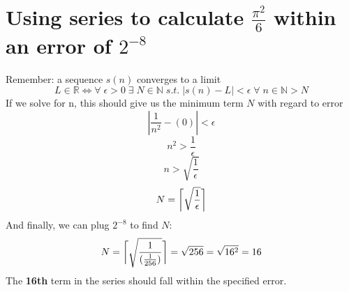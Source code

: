 \documentclass{article}
\DeclarePairedDelimiter{\ceil}{\lceil}{\rceil}
\begin{document}
\section{Using series to calculate $\frac{\pi^2}{6}$ within an error of $2^{-8}$}
    Remember: a sequence $s(n)$ converges to a limit
    \[L \in\mathbb{R}\iff\forall \; \epsilon > 0  \; \exists \; N \in \mathbb{N} \; s.t. \; |s(n) - L| < \epsilon \; \forall \; n \in \mathbb{N} > N\]
    If we solve for n, this should give us the minimum term $N$ with regard to error %
    \[ |\frac{1}{n^2} - (0)| < \epsilon\]
    \[n^2>\frac{1}{\epsilon}\]
    \[n>\sqrt{\frac{1}{\epsilon}}\]
    \[N=\ceil[\bigg]{\sqrt{\frac{1}{\epsilon}}}\]
    And finally, we can plug $2^{-8}$ to find $N$:
    \[N=\ceil[\bigg]{\sqrt{\frac{1}{(\frac{1}{256})}}}=\sqrt{256}=\sqrt{16^2}=16\]
    The \textbf{16th} term in the series should fall within the specified error.
\end{document}
